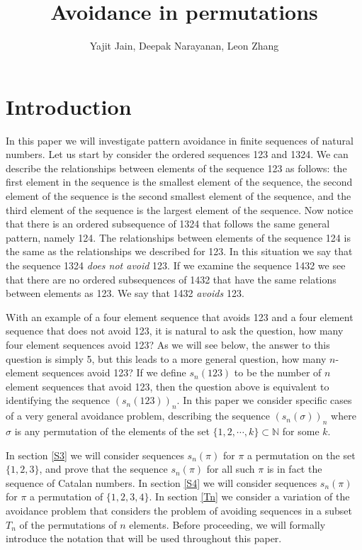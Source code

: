 \documentclass[11pt,letterpaper,twoside,english]{article}
\title{Avoidance in permutations}
\author{Yajit Jain, Deepak Narayanan, Leon Zhang}
\theoremstyle{theorem}
\theoremstyle{remark}
\begin{document}
\maketitle

\section{Introduction}

In this paper we will investigate pattern avoidance in finite sequences of natural numbers. Let us start by consider the ordered sequences 123 and 1324. We can describe the relationships between elements of the sequence 123 as follows: the first element in the sequence is the smallest element of the sequence, the second element of the sequence is the second smallest element of the sequence, and the third element of the sequence is the largest element of the sequence. Now notice that there is an ordered subsequence of 1324 that follows the same general pattern, namely 124. The relationships between elements of the sequence 124 is the same as the relationships we described for 123. In this situation we say that the sequence 1324 \emph{does not avoid} 123. If we examine the sequence 1432 we see that there are no ordered subsequences of 1432 that have the same relations between elements as 123. We say that 1432 \emph{avoids} 123. 

With an example of a four element sequence that avoids 123 and a four element sequence that does not avoid 123, it is natural to ask the question, how many four element sequences avoid 123? As we will see below, the answer to this question is simply 5, but this leads to a more general question, how many $n$-element sequences avoid 123? If we define $s_n(123)$ to be the number of $n$ element sequences that avoid 123, then the question above is equivalent to identifying the sequence $(s_n(123))_n$. In this paper we consider specific cases of a very general avoidance problem, describing the sequence $(s_n(\sigma))_n$ where $\sigma$ is any permutation of the elements of the set $\{1,2,\cdots, k\}\subset\mathbb{N}$ for some $k$. 

In section \ref{S3} we will consider sequences $s_n(\pi)$ for $\pi$ a permutation on the set $\{1,2,3\}$, and prove that the sequence $s_n(\pi)$ for all such $\pi$ is in fact the sequence of Catalan numbers. In section \ref{S4} we will consider sequences $s_n(\pi)$ for $\pi$ a permutation of $\{1,2,3,4\}$. In section \ref{Tn} we consider a variation of the avoidance problem that considers the problem of avoiding sequences in a subset $T_n$ of the permutations of $n$ elements. Before proceeding, we will formally introduce the notation that will be used throughout this paper. 
\end{document}
